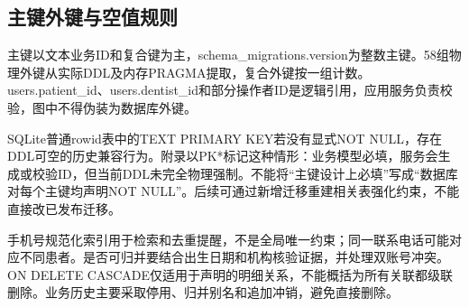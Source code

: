 \documentclass[UTF8,12pt,a4paper,fontset=none]{ctexart}
\begin{document}
\subsection{主键外键与空值规则}
主键以文本业务ID和复合键为主，schema\_\allowbreak{}migrations.\allowbreak{}version为整数主键。58组物理外键从实际DDL及内存PRAGMA提取，复合外键按一组计数。users.\allowbreak{}patient\_\allowbreak{}id、users.\allowbreak{}dentist\_\allowbreak{}id和部分操作者ID是逻辑引用，应用服务负责校验，图中不得伪装为数据库外键。\par
SQLite普通rowid表中的TEXT PRIMARY KEY若没有显式NOT NULL，存在DDL可空的历史兼容行为。附录以PK*标记这种情形：业务模型必填，服务会生成或校验ID，但当前DDL未完全物理强制。不能将“主键设计上必填”写成“数据库对每个主键均声明NOT NULL”。后续可通过新增迁移重建相关表强化约束，不能直接改已发布迁移。\par
手机号规范化索引用于检索和去重提醒，不是全局唯一约束；同一联系电话可能对应不同患者。是否可归并要结合出生日期和机构核验证据，并处理双账号冲突。ON DELETE CASCADE仅适用于声明的明细关系，不能概括为所有关联都级联删除。业务历史主要采取停用、归并别名和追加冲销，避免直接删除。\par
{}
\end{document}
